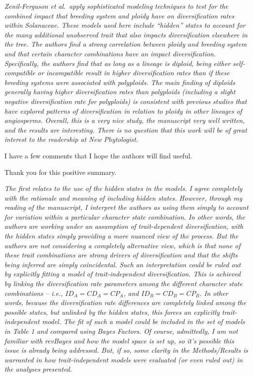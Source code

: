 \documentclass[11pt]{article}
\renewenvironment{quote}{\bigskip\noindent\itshape\ignorespaces}{\smallskip}
\begin{document}
\begin{quote}
Zenil-Ferguson et al.\ apply sophisticated modeling techniques to test for the combined impact that breeding system and ploidy have on diversification rates within Solanaceae.
These models used here include ``hidden'' states to account for the many additional unobserved trait that also impacts diversification elsewhere in the tree.
The authors find a strong correlation between ploidy and breeding system and that certain character combinations have an impact diversification.
Specifically, the authors find that as long as a lineage is diploid, being either self-compatible or incompatible result in higher diversification rates than if these breeding systems were associated with polyploids.
The main finding of diploids generally having higher diversification rates than polyploids (including a slight negative diversification rate for polyploids) is consistent with previous studies that have explored patterns of diversification in relation to ploidy in other lineages of angiosperms.
Overall, this is a very nice study, the manuscript very well written, and the results are interesting.
There is no question that this work will be of great interest to the readership at New Phytologist.

I have a few comments that I hope the authors will find useful.
\end{quote}

Thank you for this positive summary.

\begin{quote}
The first relates to the use of the hidden states in the models.
I agree completely with the rationale and meaning of including hidden states.
However, through my reading of the manuscript, I interpret the authors as using them simply to account for variation within a particular character state combination.
In other words, the authors are working under an assumption of trait-dependent diversification, with the hidden states simply providing a more nuanced view of the process.
But the authors are not considering a completely alternative view, which is that none of these trait combinations are strong drivers of diversification and that the shifts being inferred are simply coincidental.
Such an interpretation could be ruled out by explicitly fitting a model of trait-independent diversification.
This is achieved by linking the diversification rate parameters among the different character state combinations -- i.e., $ID_A=CD_A=CP_A$, and $ID_B=CD_B=CP_B$.
In other words, because the diversification rate differences are completely linked among the possible states, but unlinked by the hidden states, this forces an explicitly trait-independent model.
The fit of such a model could be included in the set of models in Table 1 and compared using Bayes Factors.
Of course, admittedly, I am not familiar with revBayes and how the model space is set up, so it's possible this issue is already being addressed.
But, if so, some clarity in the Methods/Results is warranted in how trait-independent models were evaluated (or even ruled out) in the analyses presented.
\end{quote}
\end{document}
